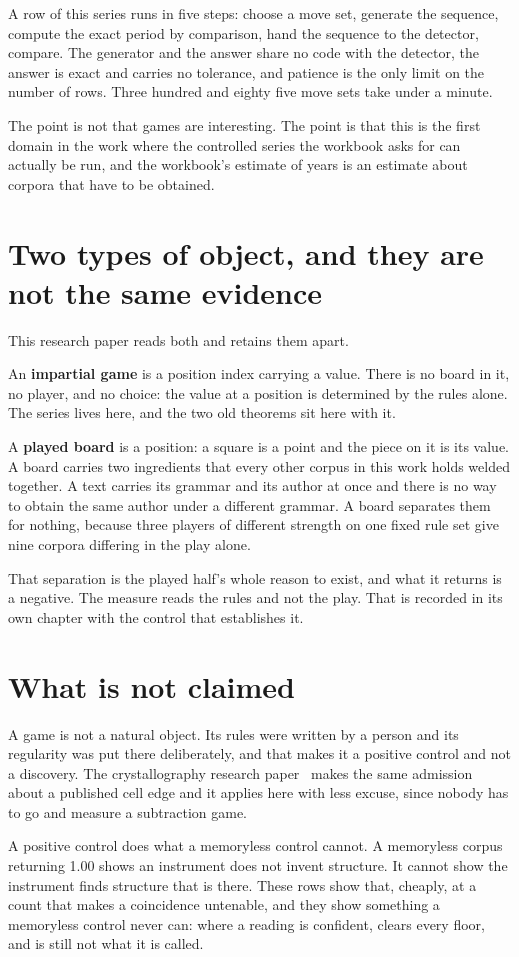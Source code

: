 A row of this series runs in five steps: choose a move set, generate the sequence, compute the
exact period by comparison, hand the sequence to the detector, compare. The generator and the answer
share no code with the detector, the answer is exact and carries no tolerance, and patience is the
only limit on the number of rows. Three hundred and eighty five move sets take under a minute.

The point is not that games are interesting. The point is that this is the first domain in the work
where the controlled series the workbook asks for can actually be run, and the workbook's estimate
of years is an estimate about corpora that have to be obtained.

\section{Two types of object, and they are not the same evidence}

This research paper reads both and retains them apart.

An \textbf{impartial game} is a position index carrying a value. There is no board in it, no player,
and no choice: the value at a position is determined by the rules alone. The series lives here, and
the two old theorems sit here with it.

A \textbf{played board} is a position: a square is a point and the piece on it is its value. A board
carries two ingredients that every other corpus in this work holds welded together. A text carries
its grammar and its author at once and there is no way to obtain the same author under a different
grammar. A board separates them for nothing, because three players of different strength on one
fixed rule set give nine corpora differing in the play alone.

That separation is the played half's whole reason to exist, and what it returns is a negative. The
measure reads the rules and not the play. That is recorded in its own chapter with the control that
establishes it.

\section{What is not claimed}

A game is not a natural object. Its rules were written by a person and its regularity was put there
deliberately, and that makes it a positive control and not a discovery. The crystallography research paper~\cite{src:Quigg-crystallography} makes
the same admission about a published cell edge and it applies here with less excuse, since nobody
has to go and measure a subtraction game.

A positive control does what a memoryless control cannot. A memoryless corpus
returning 1.00 shows an instrument does not invent structure. It cannot show the instrument finds
structure that is there. These rows show that, cheaply, at a count that makes a coincidence
untenable, and they show something a memoryless control never can: where a reading is
confident, clears every floor, and is still not what it is called.
